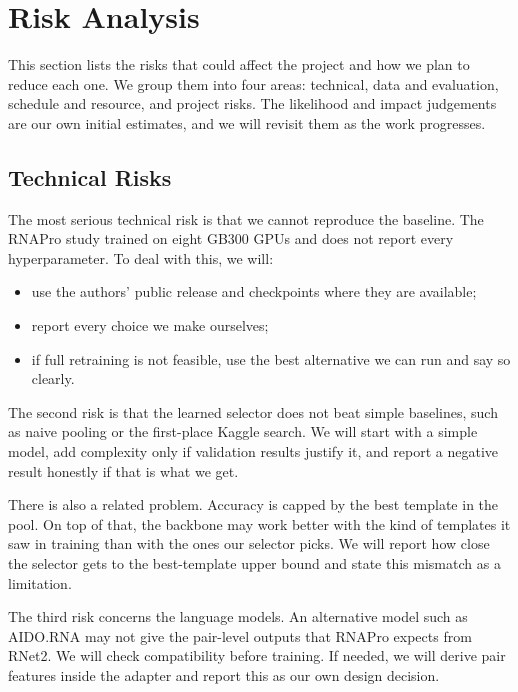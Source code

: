 \documentclass{FastFyp}
\begin{document}

\section{Risk Analysis}
This section lists the risks that could affect the project and how we plan to reduce each one. We group them into four areas: technical, data and evaluation, schedule and resource, and project risks. The likelihood and impact judgements are our own initial estimates, and we will revisit them as the work progresses.

\subsection{Technical Risks}
The most serious technical risk is that we cannot reproduce the baseline. The RNAPro study trained on eight GB300 GPUs and does not report every hyperparameter. To deal with this, we will:
\begin{itemize}
\item use the authors' public release and checkpoints where they are available;
\item report every choice we make ourselves;
\item if full retraining is not feasible, use the best alternative we can run and say so clearly.
\end{itemize}

The second risk is that the learned selector does not beat simple baselines, such as naive pooling or the first-place Kaggle search. We will start with a simple model, add complexity only if validation results justify it, and report a negative result honestly if that is what we get.

There is also a related problem. Accuracy is capped by the best template in the pool. On top of that, the backbone may work better with the kind of templates it saw in training than with the ones our selector picks. We will report how close the selector gets to the best-template upper bound and state this mismatch as a limitation.

The third risk concerns the language models. An alternative model such as AIDO.RNA may not give the pair-level outputs that RNAPro expects from RNet2. We will check compatibility before training. If needed, we will derive pair features inside the adapter and report this as our own design decision.
\end{document}
